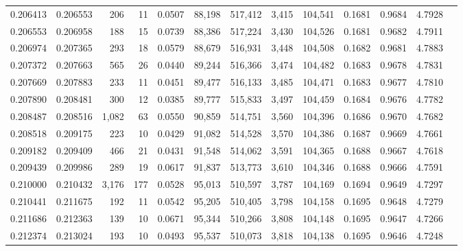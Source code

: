 \begin{tabular}{rrrrrrrrrrrrr}
0.206413 & 0.206553 &   206 &  11 &                                     0.0507 &  88,198 & 517,412 &   3,415 & 104,541 & 0.1681 & 0.9684 & 4.7928 \\
0.206553 & 0.206958 &   188 &  15 &                                     0.0739 &  88,386 & 517,224 &   3,430 & 104,526 & 0.1681 & 0.9682 & 4.7911 \\
0.206974 & 0.207365 &   293 &  18 &                                     0.0579 &  88,679 & 516,931 &   3,448 & 104,508 & 0.1682 & 0.9681 & 4.7883 \\
0.207372 & 0.207663 &   565 &  26 &                                     0.0440 &  89,244 & 516,366 &   3,474 & 104,482 & 0.1683 & 0.9678 & 4.7831 \\
0.207669 & 0.207883 &   233 &  11 &                                     0.0451 &  89,477 & 516,133 &   3,485 & 104,471 & 0.1683 & 0.9677 & 4.7810 \\
0.207890 & 0.208481 &   300 &  12 &                                     0.0385 &  89,777 & 515,833 &   3,497 & 104,459 & 0.1684 & 0.9676 & 4.7782 \\
0.208487 & 0.208516 & 1,082 &  63 &                                     0.0550 &  90,859 & 514,751 &   3,560 & 104,396 & 0.1686 & 0.9670 & 4.7682 \\
0.208518 & 0.209175 &   223 &  10 &                                     0.0429 &  91,082 & 514,528 &   3,570 & 104,386 & 0.1687 & 0.9669 & 4.7661 \\
0.209182 & 0.209409 &   466 &  21 &                                     0.0431 &  91,548 & 514,062 &   3,591 & 104,365 & 0.1688 & 0.9667 & 4.7618 \\
0.209439 & 0.209986 &   289 &  19 &                                     0.0617 &  91,837 & 513,773 &   3,610 & 104,346 & 0.1688 & 0.9666 & 4.7591 \\
0.210000 & 0.210432 & 3,176 & 177 &                                     0.0528 &  95,013 & 510,597 &   3,787 & 104,169 & 0.1694 & 0.9649 & 4.7297 \\
0.210441 & 0.211675 &   192 &  11 &                                     0.0542 &  95,205 & 510,405 &   3,798 & 104,158 & 0.1695 & 0.9648 & 4.7279 \\
0.211686 & 0.212363 &   139 &  10 &                                     0.0671 &  95,344 & 510,266 &   3,808 & 104,148 & 0.1695 & 0.9647 & 4.7266 \\
0.212374 & 0.213024 &   193 &  10 &                                     0.0493 &  95,537 & 510,073 &   3,818 & 104,138 & 0.1695 & 0.9646 & 4.7248 \\

\end{tabular}
